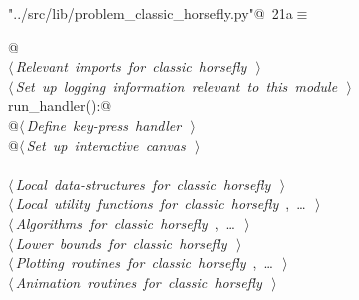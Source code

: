 \documentclass[11.5pt]{report}
\begin{document}
\begin{flushleft} \small\label{scrap13}\raggedright\small
{} \verb@"../src/lib/problem_classic_horsefly.py"@\nobreak\ {\footnotesize {21a}}$\equiv$
\vspace{-1ex}
\begin{list}{}{} \item
\mbox{}\verb@    @\\
\mbox{}\verb@@\hbox{$\langle\,${\itshape Relevant imports for classic horsefly}\nobreak\ {\footnotesize {}}$\,\rangle$}\verb@@\\
\mbox{}\verb@@\hbox{$\langle\,${\itshape Set up logging information relevant to this module}\nobreak\ {\footnotesize {}}$\,\rangle$}\verb@@\\
\mbox{}\verb@def run_handler():@\\
\mbox{}\verb@    @\hbox{$\langle\,${\itshape Define key-press handler}\nobreak\ {\footnotesize {}}$\,\rangle$}\verb@@\\
\mbox{}\verb@    @\hbox{$\langle\,${\itshape Set up interactive canvas}\nobreak\ {\footnotesize {}}$\,\rangle$}\verb@@\\
\mbox{}\verb@@\\
\mbox{}\verb@@\hbox{$\langle\,${\itshape Local data-structures for classic horsefly}\nobreak\ {\footnotesize {}}$\,\rangle$}\verb@@\\
\mbox{}\verb@@\hbox{$\langle\,${\itshape Local utility functions for classic horsefly}\nobreak\ {\footnotesize {}, \ldots\ }$\,\rangle$}\verb@@\\
\mbox{}\verb@@\hbox{$\langle\,${\itshape Algorithms for classic horsefly}\nobreak\ {\footnotesize {}, \ldots\ }$\,\rangle$}\verb@@\\
\mbox{}\verb@@\hbox{$\langle\,${\itshape Lower bounds for classic horsefly}\nobreak\ {\footnotesize {}}$\,\rangle$}\verb@@\\
\mbox{}\verb@@\hbox{$\langle\,${\itshape Plotting routines for classic horsefly}\nobreak\ {\footnotesize {}, \ldots\ }$\,\rangle$}\verb@@\\
\mbox{}\verb@@\hbox{$\langle\,${\itshape Animation routines for classic horsefly}\nobreak\ {\footnotesize {}}$\,\rangle$}\verb@@\\
\mbox{}\verb@@{\NWsep}
\end{list}
\vspace{-1.5ex}
\footnotesize
\begin{list}{}{\setlength{\itemsep}{-\parsep}\setlength{\itemindent}{-\leftmargin}}

\item{}
\end{list}
\vspace{4ex}
\end{flushleft}
\end{document}
